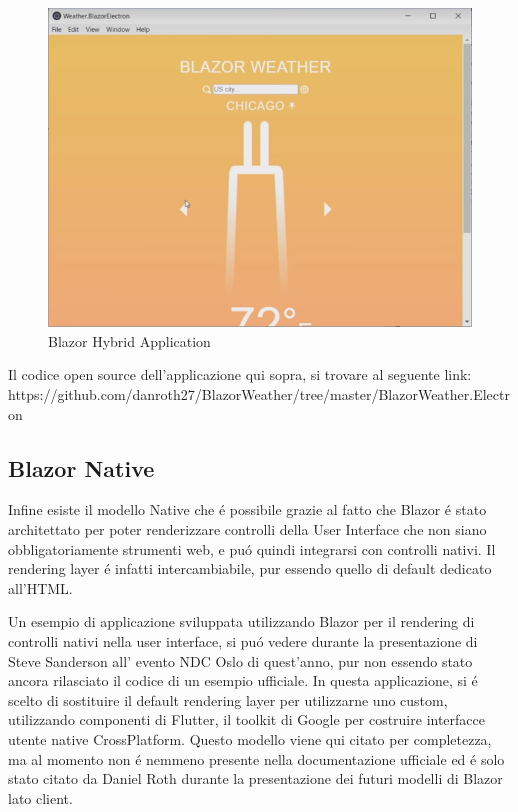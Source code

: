 \begin{figure}[H]
	\centerline{\includegraphics[scale=0.6]{figure/BlazorWeatherElectron.png}}
	\caption{Blazor Hybrid Application}
	\label{fig:BlazorHybridApplication}
\end{figure}

Il codice open source dell'applicazione qui sopra, si trovare al seguente link: https://github.com/danroth27/BlazorWeather/tree/master/BlazorWeather.Electron
\pagebreak



\subsection{Blazor Native}\label{sez:bnative}
Infine esiste il modello Native che \'e possibile grazie al fatto che Blazor \'e stato architettato per poter renderizzare controlli della User Interface che non siano obbligatoriamente strumenti web, e pu\'o quindi integrarsi con controlli nativi.
Il rendering layer \'e infatti intercambiabile, pur essendo quello di default dedicato all'HTML.

Un esempio di applicazione sviluppata utilizzando Blazor per il rendering di controlli nativi nella user interface, si pu\'o vedere durante la presentazione di Steve Sanderson all' evento NDC Oslo di quest'anno, pur non essendo stato ancora rilasciato il codice di un esempio ufficiale.\cite{sandersonNDCBlutter}
In questa applicazione, si \'e scelto di sostituire il default rendering layer per utilizzarne uno custom, utilizzando componenti di Flutter, il toolkit di Google per costruire interfacce utente native CrossPlatform.
Questo modello viene qui citato per completezza, ma al momento non \'e nemmeno presente nella documentazione ufficiale ed \'e solo stato citato da Daniel Roth durante la presentazione dei futuri modelli di Blazor lato client.\cite{blazorNative}

